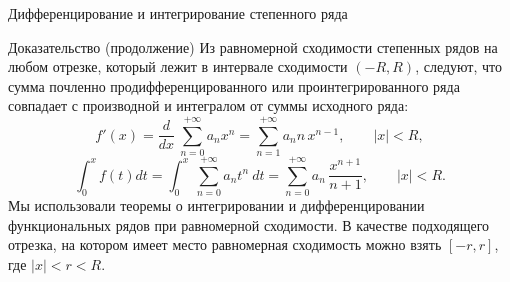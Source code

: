 \documentclass[8pt]{beamer}
\begin{document}
\begin{frame}{Дифференцирование и интегрирование степенного ряда}
\begin{block}{Доказательство (продолжение)}
Из равномерной сходимости степенных рядов на любом отрезке, который лежит в интервале сходимости $(-R,R)$, следуют, что сумма почленно продифференцированного или проинтегрированного ряда совпадает с производной  и интегралом от суммы исходного ряда:
$$f'(x) =\frac{d}{dx}\ \sum_{n=0}^{+\infty} a_n x^{n} = \sum_{n=1}^{+\infty} a_n n\, x^{n-1},\qquad |x|<R,$$
$$\int_0^x f(t)dt = \int_0^x\ \sum_{n=0}^{+\infty} a_n t^{n}\ dt= \sum_{n=0}^{+\infty} a_n\, \frac{x^{n+1}}{n+1},\qquad |x|<R.$$
Мы использовали теоремы о интегрировании и дифференцировании функциональных рядов при равномерной сходимости. В качестве подходящего отрезка, на котором имеет место равномерная сходимость можно взять $[-r,r]$, где $|x|< r<R$.
\end{block}
\end{frame}

\end{document}
